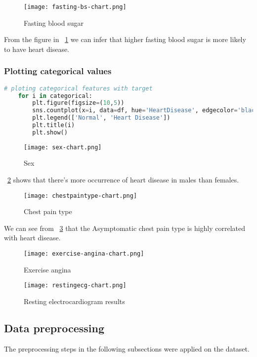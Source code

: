 \begin{figure}[htb]
	\centering
	\texttt{[image: fasting-bs-chart.png]}
	\caption{Fasting blood sugar}
	\label{fig:fasting-bs-chart}
\end{figure}

From the figure in ~\ref{fig:fasting-bs-chart} we can infer that higher fasting blood sugar is more likely to have heart disease.
\subsubsection{Plotting categorical values}

\begin{lstlisting}[language=Python, caption={Plotting categorical values}]
	# ploting categorical features with target
	for i in categorical:
		plt.figure(figsize=(10,5))
		sns.countplot(x=i, data=df, hue='HeartDisease', edgecolor='black')
		plt.legend(['Normal', 'Heart Disease'])
		plt.title(i)
		plt.show()
\end{lstlisting}

\begin{figure}[htb]
	\centering
	\texttt{[image: sex-chart.png]}
	\caption{Sex}
	\label{fig:sex-chart}
\end{figure}
\figurename~\ref{fig:sex-chart} shows that there's more occurrence of heart disease in males than females.

\begin{figure}[htb]
	\centering
	\texttt{[image: chestpaintype-chart.png]}
	\caption{Chest pain type}
	\label{fig:chestpaintype-chart}
\end{figure}
We can see from \figurename~\ref{fig:chestpaintype-chart} that the Asymptomatic chest pain type is highly correlated with heart disease.

\begin{figure}[htb]
	\centering
	\texttt{[image: exercise-angina-chart.png]}
	\caption{Exercise angina}
	\label{fig:exercise-angina-chart}
\end{figure}

\begin{figure}[htb]
	\centering
	\texttt{[image: restingecg-chart.png]}
	\caption{Resting electrocardiogram results}
	\label{fig:restingect-chart}
\end{figure}

\subsection{Data preprocessing}
The preprocessing steps in the following subsections were applied on the dataset.
